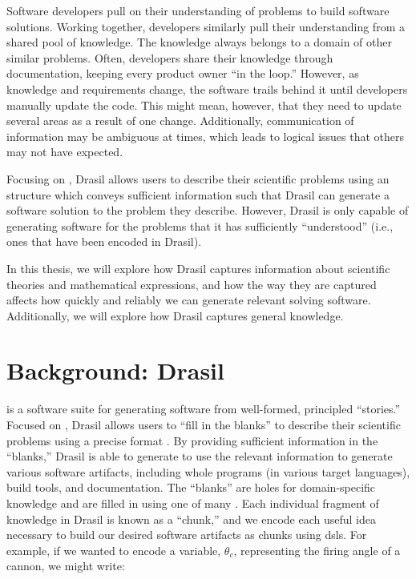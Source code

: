 Software developers pull on their understanding of problems to build software
solutions. Working together, developers similarly pull their understanding from
a shared pool of knowledge. The knowledge always belongs to a domain of other
similar problems. Often, developers share their knowledge through documentation,
keeping every product owner ``in the loop.'' However, as knowledge and
requirements change, the software trails behind it until developers manually
update the code. This might mean, however, that they need to update several
areas as a result of one change. Additionally, communication of information may
be ambiguous at times, which leads to logical issues that others may not have
expected.

Focusing on , Drasil allows users to describe their scientific problems
using an  structure which conveys sufficient information such that
Drasil can generate a software solution to the problem they describe. However,
Drasil is only capable of generating software for the problems that it has
sufficiently ``understood'' (i.e., ones that have been encoded in Drasil).

In this thesis, we will explore how Drasil captures information about scientific
theories and mathematical expressions, and how the way they are captured affects
how quickly and reliably we can generate relevant solving software.
Additionally, we will explore how Drasil captures general knowledge.

\section{Background: Drasil}
\label{chap:introduction:sec:background}

 is a software suite
for generating software from well-formed, principled ``stories.'' Focused on
, Drasil allows users to ``fill in the blanks'' to describe their
scientific problems using a precise  format \cite{SmithAndLai2005}. By
providing sufficient information in the ``blanks,'' Drasil is able to generate
to use the relevant information to generate various software artifacts,
including whole programs (in various target languages), build tools, and
documentation. The ``blanks'' are holes for domain-specific knowledge and are
filled in using one of many . Each individual fragment of knowledge in
Drasil is known as a ``chunk,'' and we encode each useful idea necessary to
build our desired software artifacts as chunks using \acsp{dsl}. For example, if
we wanted to encode a variable, \(\theta{}_{c}\), representing the firing angle
of a cannon, we might write:


